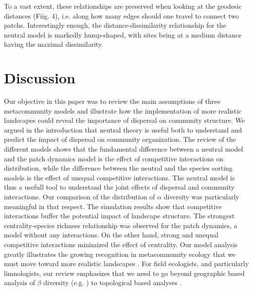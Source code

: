 \documentclass[12pt]{article}
\begin{document}
To a vast extent, these relationships are preserved when looking at the
geodesic distances (Fiig. 4), i.e. along how many edges should one travel to
connect two patchs. Interestingly enough, the distance-dissimilarity
relationship for the neutral model is markedly hump-shaped, with sites being at
a medium distance having the maximal dissimilarity.

\section{Discussion}

Our objective in this paper was to review the main assumptions of three
metacommunity models and illustrate how the implementation of more realistic
landscapes could reveal the importance of dispersal on community structure. We
argued in the introduction that neutral theory is useful both to understand and
predict the impact of dispersal on community organization. The review of the
different models shows that the fundamental difference between a neutral model
and the patch dynamics model is the effect of competitive interactions on
distribution, while the difference between the neutral and the species sorting
models is the effect of unequal competitive interactions. The neutral model is
thus a usefull tool to understand the joint effects of dispersal and community
interactions. Our comparison of the distribution of $\alpha$ diversity was
particularly meaningful in that respect. The simulation results show that
competitive interactions buffer the potential impact of landscape structure. The
strongest centrality-species richness relationship was observed for the patch
dynamics, a model without any interactions. On the other hand, strong and
unequal competitive interactions minimized the effect of centrality. Our model
analysis greatly illustrates the growing recognition in metacommunity ecology
that we must move toward more realistic landscapes \parencite{Gilarranz2012}.
For field ecologists, and particularly limnologists, our review emphasizes that
we need to go beyond geographic based analysis of $\beta$ diversity (e.g.
\parencite{Legendre2005}) to topological based analyses
\parencite{Peterson2013}.
\end{document}
